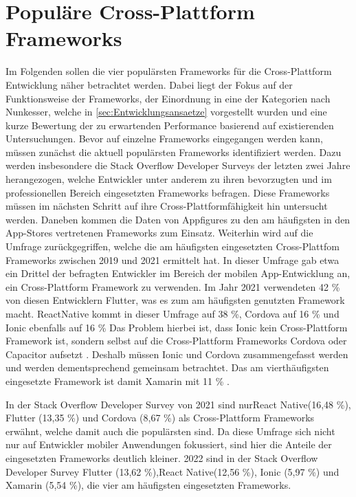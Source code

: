\chapter{Populäre Cross-Plattform Frameworks}
\label{ch:Frameworks}

Im Folgenden sollen die vier populärsten Frameworks für die Cross-Plattform Entwicklung näher betrachtet werden.
Dabei liegt der Fokus auf der Funktionsweise der Frameworks, der Einordnung in eine der Kategorien nach Nunkesser, welche in \autoref{sec:Entwicklungsansaetze} vorgestellt wurden und eine kurze Bewertung der zu erwartenden Performance basierend auf existierenden Untersuchungen.
Bevor auf einzelne Frameworks eingegangen werden kann, müssen zunächst die aktuell populärsten Frameworks identifiziert werden.
Dazu werden insbesondere die Stack Overflow Developer Surveys der letzten zwei Jahre \cite{Stackoverflow_2021} \cite{Stackoverflow_2022} herangezogen, welche Entwickler unter anderem zu ihren bevorzugten und im professionellen Bereich eingesetzten Frameworks befragen.
Diese Frameworks müssen im nächsten Schritt auf ihre Cross-Plattformfähigkeit hin untersucht werden.
Daneben kommen die Daten von Appfigures zu den am häufigsten in den App-Stores vertretenen Frameworks \cite{Appfigures_TopSDKs} zum Einsatz.
Weiterhin wird auf die Umfrage \cite{Statista_UsedCrossPlatformFrameworks} zurückgegriffen, welche die am häufigsten eingesetzten Cross-Plattfom Frameworks zwischen 2019 und 2021 ermittelt hat.
In dieser Umfrage gab etwa ein Drittel der befragten Entwickler im Bereich der mobilen App-Entwicklung an, ein Cross-Plattform Framework zu verwenden.
Im Jahr 2021 verwendeten 42 \% von diesen Entwicklern Flutter, was es zum am häufigsten genutzten Framework macht.
ReactNative kommt in dieser Umfrage auf 38 \%, Cordova auf 16 \% und Ionic ebenfalls auf 16 \%
Das Problem hierbei ist, dass Ionic kein Cross-Plattform Framework ist, sondern selbst auf die Cross-Plattform Frameworks Cordova oder Capacitor aufsetzt \cite{Ionic_Docs}.
Deshalb müssen Ionic und Cordova zusammengefasst werden und werden dementsprechend gemeinsam betrachtet.
Das am vierthäufigsten eingesetzte Framework ist damit Xamarin mit 11 \% \cite{Statista_UsedCrossPlatformFrameworks}.

In der Stack Overflow Developer Survey von 2021 \cite{Stackoverflow_2021} sind nurReact Native(16,48 \%), Flutter (13,35 \%) und Cordova (8,67 \%) als Cross-Plattform Frameworks erwähnt, welche damit auch die populärsten sind.
Da diese Umfrage sich nicht nur auf Entwickler mobiler Anwendungen fokussiert, sind hier die Anteile der eingesetzten Frameworks deutlich kleiner.
2022 sind in der Stack Overflow Developer Survey \cite{Stackoverflow_2022} Flutter (13,62 \%),React Native(12,56 \%), Ionic (5,97 \%) und Xamarin (5,54 \%), die vier am häufigsten eingesetzten Frameworks.

